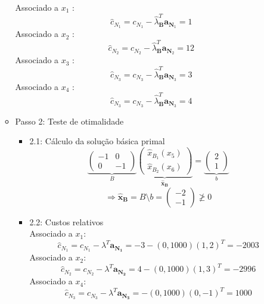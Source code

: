                                                                                                                                                                                                                                                                                                                                                                                                                                                                                                                                                                                                                                                                                                                                                                                                                                                                                                                                                                                                                                                                                                                                                                                                                                                                                                                                                                                                                                                                                                                                                                                                                                                                                                                                                                                                                                                                                                                                                                                                                                                                                                                                                                                                                                                                                                                                                                                                                                                                                                                                                                                                                                                                                                                                                                                                                                                                                                                                                                                                                                                                                                                                                                                                                                                                                                                                                                                                                                                                                                                                                                                                                                                                                                                                                                                                                                                                                                                                                                                                                                                                                                                                                                                                                                                                                                                                                                                                                                                                                                                                                                                                                                                                                                                                                                                                                                                                                                                                                                                                                                                                                                                                                                                                                                                                                                                                                                                                                                                                                                                                                                                                                                                                                                                                                                                                                                                                                                                                                                                                                                                                                                                                                                                                                                                                                                                                                                                                                                                                                                                                                                                                                                                                                                                                                                                                                                                                                                                                                                                                                                                                                                                                                                                                                                                                                                                                                                                                                                          \documentclass[a4paper, 12pt]{article}
\begin{document}
\begin{itemize}
\begin{itemize}
Associado a $x_{1}$ :
$$
\hat{c}_{N_{1}}=c_{N_{1}}-\hat{\lambda}_{\mathbf{B}}^{T} \mathbf{a}_{\mathbf{N}_{1}}=1
$$
Associado a $x_{2}$ :
$$
\hat{c}_{N_{2}}=c_{N_{2}}-\hat{\lambda}_{\mathbf{B}}^{T} \mathbf{a}_{\mathbf{N}_{2}}=12
$$
Associado a $x_{3}$ :
$$
\hat{c}_{N_{3}}=c_{N_{3}}-\hat{\lambda}_{\mathbf{B}}^{T} \mathbf{a}_{\mathbf{N}_{3}}=3
$$
Associado a $x_{4}$ :
$$
\hat{c}_{N_{3}}=c_{N_{3}}-\hat{\lambda}_{\mathbf{B}}^{T} \mathbf{a}_{\mathbf{N}_{3}}=4
$$
\item Passo 2: Teste de otimalidade
\begin{itemize}
\item 2.1: Cálculo da solução básica primal
\[
\underbrace{
\begin{pmatrix}
-1&0\\
0&-1
\end{pmatrix}}_B
\underbrace{
\begin{pmatrix}
\hat{x}_{B_1} (x_5)\\
\hat{x}_{B_2} (x_6)
\end{pmatrix}}_{\mathbf{\hat{x}_B}}
=
\underbrace{
\begin{pmatrix}
2\\
1
\end{pmatrix}}_{b}
\]
\[
\Rightarrow \mathbf{\hat{x}_B} = B \setminus b =
\begin{pmatrix}
-2\\
-1
\end{pmatrix}
\ngeq 0
\]
\item 2.2: Custos relativos\\
Associado a $x_1$:
\[
\hat{c}_{N_1}=c_{N_1}-\lambda^T\mathbf{a_{N_1}}=-3-(0,1000)(1,2)^T=-2003
\]
Associado a $x_2$:
\[
\hat{c}_{N_2}=c_{N_2}-\lambda^T\mathbf{a_{N_2}}=4-(0,1000)(1,3)^T=-2996
\]
Associado a $x_4$:
\[
\hat{c}_{N_3}=c_{N_3}-\lambda^T\mathbf{a_{N_3}}=-(0,1000)(0,-1)^T=1000
\]


\end{itemize}
\end{itemize}
\end{itemize}
\end{document}
